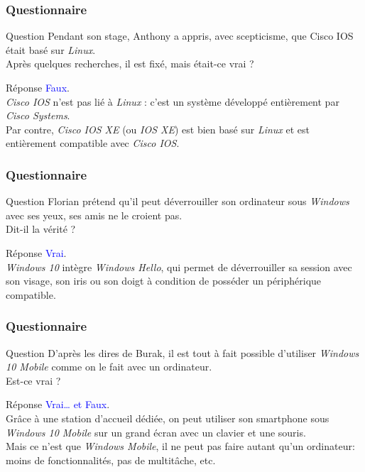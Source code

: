 \documentclass[aspectratio=169]{beamer}
\begin{document}
\begin{frame}
  \frametitle{Questionnaire}
  \begin{exampleblock}{Question}
    Pendant son stage, Anthony a appris, avec scepticisme, que Cisco IOS était
    basé sur \textit{Linux}. \\
    Après quelques recherches, il est fixé, mais était-ce vrai ?
  \end{exampleblock}

  \pause

  \begin{block}{Réponse}
    \textcolor{blue}{Faux}. \\
    \textit{Cisco IOS} n'est pas lié à \textit{Linux} : c'est un système développé entièrement par
    \textit{Cisco Systems}. \\
    Par contre, \textit{Cisco IOS XE} (ou \textit{IOS XE}) est bien basé sur \textit{Linux} et est
    entièrement compatible avec \textit{Cisco IOS}.
  \end{block}
\end{frame}

\begin{frame}
  \frametitle{Questionnaire}
  \begin{exampleblock}{Question}
    Florian prétend qu’il peut déverrouiller son ordinateur sous \textit{Windows} avec
    ses yeux, ses amis ne le croient pas. \\
    Dit-il la vérité ?
  \end{exampleblock}

  \pause

  \begin{block}{Réponse}
    \textcolor{blue}{Vrai}. \\
    \textit{Windows 10} intègre \textit{Windows Hello}, qui permet de déverrouiller sa session avec
    son visage, son iris ou son doigt à condition de posséder un périphérique
    compatible.
  \end{block}
\end{frame}

\begin{frame}
  \frametitle{Questionnaire}
  \begin{exampleblock}{Question}
    D’après les dires de Burak, il est tout à fait possible d’utiliser \textit{Windows
    10 Mobile} comme on le fait avec un ordinateur. \\
    Est-ce vrai ?
  \end{exampleblock}

  \pause

  \begin{block}{Réponse}
    \textcolor{blue}{Vrai… et Faux}. \\
    Grâce à une station d'accueil dédiée, on peut utiliser son smartphone sous
    \textit{Windows 10 Mobile} sur un grand écran avec un clavier et une souris. \\
    Mais ce n'est que \textit{Windows Mobile}, il ne peut pas faire autant qu'un
    ordinateur: moins de fonctionnalités, pas de multitâche, etc.
  \end{block}
\end{frame}
\end{document}
